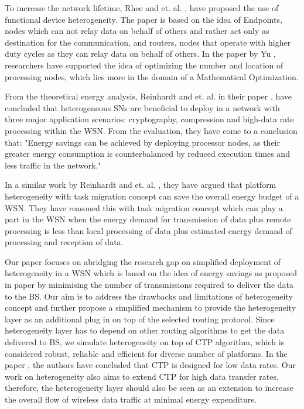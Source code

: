 To increase the network lifetime, Rhee and et. al. \cite{Rhee:2004}, have proposed the use of functional device heterogeneity. The paper is based on the idea of Endpoints, nodes which can not relay data on behalf of others and rather act only as destination for the communication, and routers, nodes that operate with higher duty cycles as they can relay data on behalf of others. In the paper by Yu \cite{Yu:2007}, researchers have supported the idea of optimizing the number and location of processing nodes, which lies more in the domain of a Mathematical Optimization.

\par
From the theoretical energy analysis, Reinhardt and et. al. in their paper \cite{reinhardt2013exploiting}, have concluded that heterogeneous \acp{SN} are beneficial to deploy in a network with three major application scenarios: cryptography, compression and high-data rate processing within the \ac{WSN}. From the evaluation, they have come to a conclusion that: "Energy savings can be achieved by deploying processor nodes, as their greater energy consumption is counterbalanced by reduced execution times and less traffic in the network." 

In a similar work by Reinhardt and et. al. \cite{reinhardt2008designing}, they have argued that platform heterogeneity with task migration concept can save the overall energy budget of a \ac{WSN}. They have reasoned this with task migration concept which can play a part in the \ac{WSN} when the energy demand for transmission of data plus remote processing is less than local processing of data plus estimated energy demand of processing and reception of data. 

Our paper focuses on abridging the research gap on simplified deployment of heterogeneity in a \ac{WSN} which is based on the idea of energy savings as proposed in paper \cite{reinhardt2013exploiting} by minimising the number of transmissions required to deliver the data to the \ac{BS}. Our aim is to address the drawbacks and limitations of heterogeneity concept and further propose a simplified mechanism to provide the heterogeneity layer as an additional plug in on top of the selected routing protocol. Since heterogeneity layer has to depend on other routing algorithms to get the data delivered to \ac{BS}, we simulate heterogeneity on top of \ac{CTP} algorithm, which is considered robust, reliable and efficient for diverse number of platforms. In the paper \cite{pecho2010simulation}, the authors have concluded that \ac{CTP} is designed for low data rates. Our work on heterogeneity also aims to extend \ac{CTP} for high data transfer rates. therefore, the heterogeneity layer should also be seen as an extension to increase the overall flow of wireless data traffic at minimal energy expenditure. 

